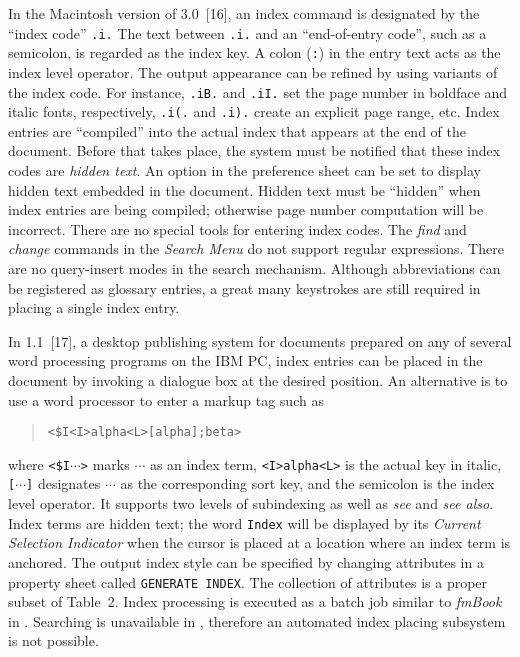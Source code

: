 In the Macintosh version of {\WD} 3.0~[16], an index command is
designated by the ``index code'' \verb|.i.|  The text between \verb|.i.|
and an ``end-of-entry code'', such as a semicolon, is regarded
as the index key.  A colon (\verb|:|) in the entry text acts as the index
level operator.  The output appearance can be refined by using
variants of the index code.  For instance,
\verb|.iB.| and \verb|.iI.| set the page number in boldface and
italic fonts, respectively, \verb|.i(.| and \verb|.i).| create
an explicit page range, etc.  Index entries are ``compiled''
into the actual index that appears at the end of the document.
Before that takes place, the system must be notified that these index codes
are {\it hidden text\/}.  An option in the preference sheet
can be set to display hidden text embedded in the document.
Hidden text must be ``hidden'' when index entries are being compiled;
otherwise page number computation will be incorrect.
There are no special tools for entering index codes.
The {\sl find\/} and {\sl change\/} commands in the {\sl Search Menu\/}
do not support regular expressions.  There are no query-insert
modes in the search mechanism.  Although abbreviations can be registered
as glossary entries, a great many keystrokes are still required in placing
a single index entry.

In {\VP} 1.1~[17], a desktop publishing system
for documents prepared on any of several word processing
programs on the IBM PC, index entries can be placed in the document by
invoking a dialogue box at the desired position.
An alternative is to use a word processor to enter a markup tag such as
\begin{quote}
\verb|<$I<I>alpha<L>[alpha];beta>|
\end{quote}
where \verb|<$I|$\cdots$\verb|>| marks $\cdots$ as an index term,
\verb|<I>alpha<L>| is the actual key in italic,
\verb|[|$\cdots$\verb|]| designates $\cdots$ as the corresponding sort key,
and the semicolon is the index level operator.
It supports two levels of subindexing as well as {\it see\/} and
{\it see also\/}.  Index terms are hidden text; the word {\tt Index}
will be displayed by its {\it Current Selection Indicator\/} when
the cursor is placed at a location where an index term is anchored.
The output index style can be specified by changing attributes in
a property sheet called {\tt GENERATE INDEX}.  The collection of
attributes is a proper subset of Table~2.  Index processing is executed
as a batch job similar to {\sl fmBook\/} in {\FM}.  Searching is unavailable
in {\VP}, therefore an automated index placing subsystem is not possible.


